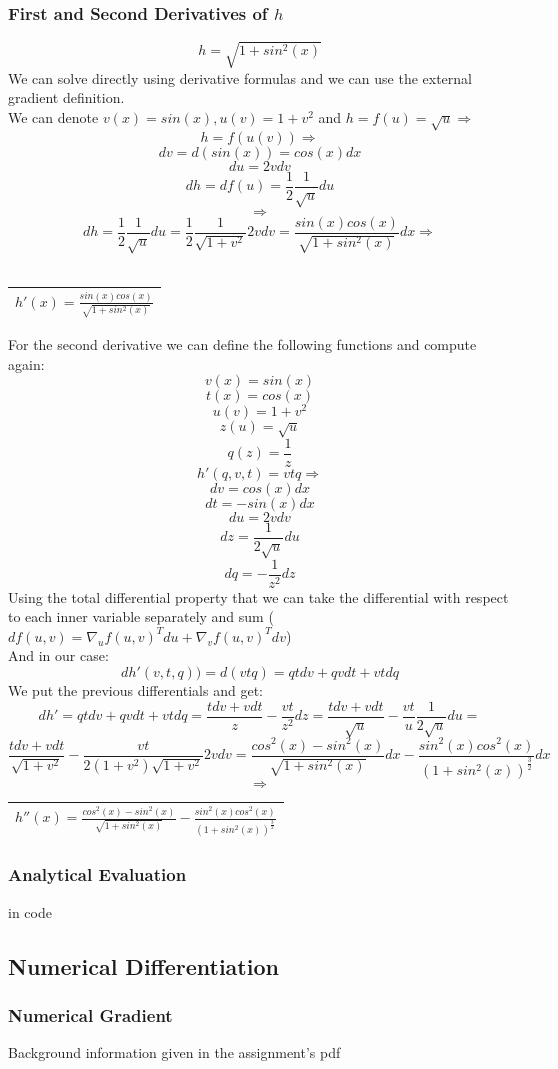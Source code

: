 \documentclass[12pt]{article}
\newcommand{\rectres}[1]{
\begin{center}
\begin{tabular}{ |c| }
\hline
 #1\\
\hline
\end{tabular}
\end{center}
}
\begin{document}
\subsubsection{First and Second Derivatives of $h$}
$$h=\sqrt{1+sin^2(x)}$$
We can solve directly using derivative formulas and we can use the external gradient definition.\\
We can denote $v(x)=sin(x),u(v)=1+v^2$ and $h = f(u)=\sqrt{u} \Rightarrow$ 
$$h=f(u(v)) \Rightarrow$$
$$dv=d(sin(x))=cos(x)dx$$
$$ du=2vdv$$
$$ dh=df(u)=\frac{1}{2}\frac{1}{\sqrt{u}}du$$
$$\Rightarrow$$
$$dh=\frac{1}{2}\frac{1}{\sqrt{u}}du=\frac{1}{2}\frac{1}{\sqrt{1+v^2}}2vdv=\frac{sin(x)cos(x)}{\sqrt{1+sin^2(x)}}dx \Rightarrow$$\\
\rectres{$h'(x)=\frac{sin(x)cos(x)}{\sqrt{1+sin^2(x)}}$}
For the second derivative we can define the following functions and compute again:\\ $$v(x)=sin(x)$$ 
$$t(x)=cos(x)$$
$$u(v)=1+v^2$$
$$z(u)=\sqrt{u}$$
$$q(z)=\frac{1}{z}$$
$$h'(q,v,t)=vtq\Rightarrow$$
$$dv=cos(x)dx$$
$$dt=-sin(x)dx$$
$$du=2vdv$$
$$dz=\frac{1}{2\sqrt{u}}du$$
$$dq=-\frac{1}{z^2}dz$$
Using the total differential property that we can take the differential with respect to each inner variable separately and sum ($df(u,v)=\nabla_u f(u,v)^Tdu + \nabla_v f(u,v)^Tdv$)\\
And in our case:
$$dh'(v,t,q))=d(vtq)=qtdv+qvdt+vtdq$$
We put the previous differentials and get:\\
$$dh'=qtdv+qvdt+vtdq=\frac{tdv+vdt}{z}-\frac{vt}{z^2}dz=\frac{tdv+vdt}{\sqrt{u}}-\frac{vt}{u}\frac{1}{2\sqrt{u}}du=$$
$$\frac{tdv+vdt}{\sqrt{1+v^2}}-\frac{vt}{2(1+v^2)\sqrt{1+v^2}}2vdv=\frac{cos^2(x)-sin^2(x)}{\sqrt{1+sin^2(x)}}dx-\frac{sin^2(x)cos^2(x)}{(1+sin^2(x))^{\frac{3}{2}}}dx$$
$$\Rightarrow$$
\rectres{$h''(x)=\frac{cos^2(x)-sin^2(x)}{\sqrt{1+sin^2(x)}}-\frac{sin^2(x)cos^2(x)}{(1+sin^2(x))^{\frac{3}{2}}}$}

\subsubsection{Analytical Evaluation}
in code

\subsection{Numerical Differentiation}
\subsubsection{Numerical Gradient}
Background information given in the assignment's pdf
\end{document}
